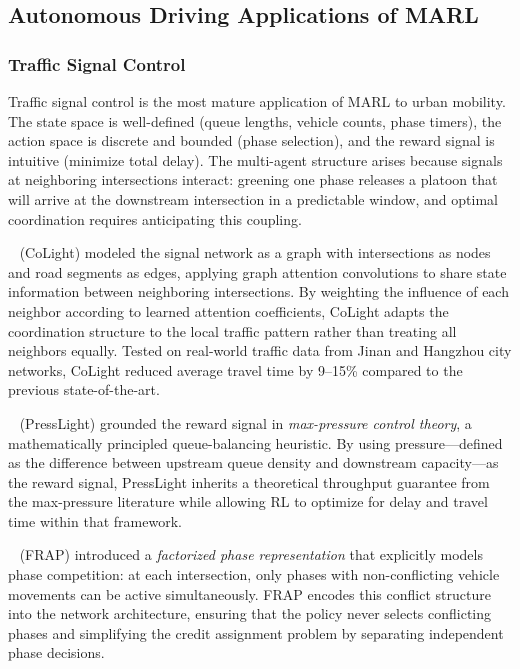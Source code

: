 \documentclass[12pt, a4paper]{article}
\begin{document}
\subsection{Autonomous Driving Applications of MARL}
\label{sec:ad_apps}

\subsubsection{Traffic Signal Control}

Traffic signal control is the most mature application of MARL to urban mobility.
The state space is well-defined (queue lengths, vehicle counts, phase timers),
the action space is discrete and bounded (phase selection), and the reward
signal is intuitive (minimize total delay).  The multi-agent structure arises
because signals at neighboring intersections interact: greening one phase
releases a platoon that will arrive at the downstream intersection in a
predictable window, and optimal coordination requires anticipating this
coupling.

\citeauthor{wei2019colight}~\cite{wei2019colight} (CoLight) modeled the signal
network as a graph with intersections as nodes and road segments as edges,
applying graph attention convolutions to share state information between
neighboring intersections.  By weighting the influence of each neighbor
according to learned attention coefficients, CoLight adapts the coordination
structure to the local traffic pattern rather than treating all neighbors
equally.  Tested on real-world traffic data from Jinan and Hangzhou city
networks, CoLight reduced average travel time by 9--15\% compared to
the previous state-of-the-art.

\citeauthor{wei2019presslight}~\cite{wei2019presslight} (PressLight) grounded
the reward signal in \emph{max-pressure control theory}, a mathematically
principled queue-balancing heuristic.  By using pressure---defined as the
difference between upstream queue density and downstream capacity---as the
reward signal, PressLight inherits a theoretical throughput guarantee from the
max-pressure literature while allowing RL to optimize for delay and travel
time within that framework.

\citeauthor{zheng2019learning}~\cite{zheng2019learning} (FRAP) introduced a
\emph{factorized phase representation} that explicitly models phase competition:
at each intersection, only phases with non-conflicting vehicle movements can
be active simultaneously.  FRAP encodes this conflict structure into the network
architecture, ensuring that the policy never selects conflicting phases and
simplifying the credit assignment problem by separating independent phase
decisions.
\end{document}
